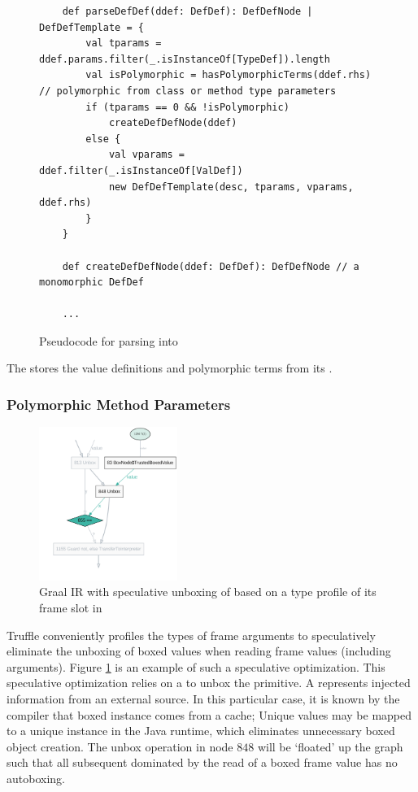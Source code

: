 \begin{figure}[!htb]
	\begin{verbatim}
	def parseDefDef(ddef: DefDef): DefDefNode | DefDefTemplate = {		
		val tparams = ddef.params.filter(_.isInstanceOf[TypeDef]).length
		val isPolymorphic = hasPolymorphicTerms(ddef.rhs) // polymorphic from class or method type parameters
		if (tparams == 0 && !isPolymorphic)
			createDefDefNode(ddef)
		else {
			val vparams = ddef.filter(_.isInstanceOf[ValDef])
			new DefDefTemplate(desc, tparams, vparams, ddef.rhs)
		}
	}

	def createDefDefNode(ddef: DefDef): DefDefNode // a monomorphic DefDef
		
	...
	\end{verbatim}
	\caption{Pseudocode for parsing  into }

\end{figure}

The  stores the value definitions and polymorphic terms from its .

\subsubsection*{Polymorphic Method Parameters}

\begin{figure}[!htb]
	\centering
	\includegraphics[width=0.4\textwidth]{figures/dot/List.contains.boxed-param-read.TruffleTier.png}
	\caption{Graal IR with speculative unboxing of  based on a type profile of its frame slot in }
	\label{graalir:cons-contains-param-read}
\end{figure}

Truffle conveniently profiles the types of frame arguments to speculatively eliminate the unboxing of boxed values when reading frame values (including arguments).
Figure \ref{graalir:cons-contains-param-read} is an example of such a speculative optimization.
This speculative optimization relies on a  to unbox the primitive.
A  represents injected information from an external source.
In this particular case, it is known by the compiler that boxed instance comes from a cache; Unique  values may be mapped to a unique  instance in the Java runtime, which eliminates unnecessary boxed object creation.
The unbox operation in node $848$ will be `floated' up the graph such that all subsequent dominated by the read of a boxed frame value has no autoboxing.


